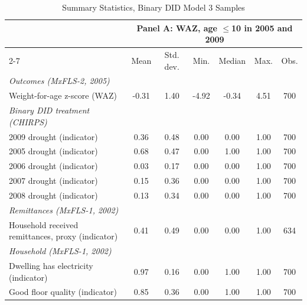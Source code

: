\documentclass[12pt]{article}
\begin{document}
\begingroup
\footnotesize
\renewcommand{\arraystretch}{0.86}
\setlength{\tabcolsep}{4pt}
\setlength{\LTcapwidth}{\textwidth}
\begin{longtable}{l*{6}{c}}
\caption{Summary Statistics, Binary DID Model 3 Samples}\\
\toprule
 & \multicolumn{6}{c}{Panel A: WAZ, age \ensuremath{\le}10 in 2005 and 2009}\\
\cmidrule(lr){2-7}
                    &        Mean&   Std. dev.&        Min.&      Median&        Max.&        Obs.\\
\midrule
\textit{Outcomes (MxFLS-2, 2005)}&            &            &            &            &            &            \\
Weight-for-age z-score (WAZ)&       -0.31&        1.40&       -4.92&       -0.34&        4.51&         700\\
\addlinespace[6pt]\textit{Binary DID treatment (CHIRPS)}&            &            &            &            &            &            \\
2009 drought (indicator)&        0.36&        0.48&        0.00&        0.00&        1.00&         700\\
2005 drought (indicator)&        0.68&        0.47&        0.00&        1.00&        1.00&         700\\
2006 drought (indicator)&        0.03&        0.17&        0.00&        0.00&        1.00&         700\\
2007 drought (indicator)&        0.15&        0.36&        0.00&        0.00&        1.00&         700\\
2008 drought (indicator)&        0.13&        0.34&        0.00&        0.00&        1.00&         700\\
\addlinespace[6pt]\textit{Remittances (MxFLS-1, 2002)}&            &            &            &            &            &            \\
Household received remittances, proxy (indicator)&        0.41&        0.49&        0.00&        0.00&        1.00&         634\\
\addlinespace[6pt]\textit{Household (MxFLS-1, 2002)}&            &            &            &            &            &            \\
Dwelling has electricity (indicator)&        0.97&        0.16&        0.00&        1.00&        1.00&         700\\
Good floor quality (indicator)&        0.85&        0.36&        0.00&        1.00&        1.00&         700\\

\end{longtable}
\end{document}
